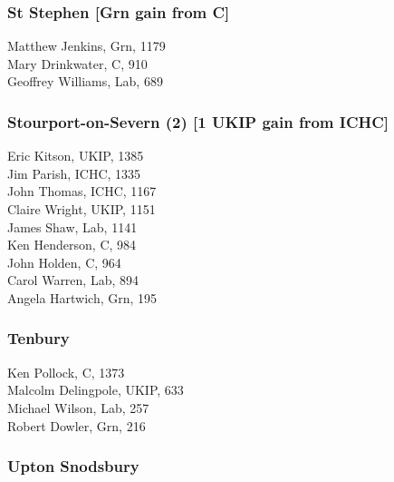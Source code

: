 \documentclass[a4paper,openany,10pt]{book}
\begin{document}
\subsubsection*{St Stephen \hspace*{\fill}\nolinebreak[1]%
\enspace\hspace*{\fill}
[Grn gain from C]}



Matthew Jenkins, Grn, 1179\\
Mary Drinkwater, C, 910\\
Geoffrey Williams, Lab, 689\\


\subsubsection*{Stourport-on-Severn (2) \hspace*{\fill}\nolinebreak[1]%
\enspace\hspace*{\fill}
[1 UKIP gain from ICHC]}



Eric Kitson, UKIP, 1385\\
Jim Parish, ICHC, 1335\\
John Thomas, ICHC, 1167\\
Claire Wright, UKIP, 1151\\
James Shaw, Lab, 1141\\
Ken Henderson, C, 984\\
John Holden, C, 964\\
Carol Warren, Lab, 894\\
Angela Hartwich, Grn, 195\\


\subsubsection*{Tenbury}



Ken Pollock, C, 1373\\
Malcolm Delingpole, UKIP, 633\\
Michael Wilson, Lab, 257\\
Robert Dowler, Grn, 216\\


\subsubsection*{Upton Snodsbury}
\end{document}
